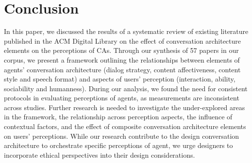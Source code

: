 
\section{Conclusion}

In this paper, we discussed the results of a systematic review of existing literature published in the ACM Digital Library on the effect of conversation architecture elements on the perceptions of CAs. Through our synthesis of 57 papers in our corpus, we present a framework outlining the relationships between elements of agents’ conversation architecture (dialog strategy, content affectiveness, content style and speech format) and aspects of users’ perception (interaction, ability, sociability and humanness). During our analysis, we found the need for consistent protocols in evaluating perceptions of agents, as measurements are inconsistent across studies. Further research is needed to investigate the under-explored areas in the framework, the relationship across perception aspects, the influence of contextual factors, and the effect of composite conversation architecture elements on users' perceptions. While our research contribute to the design conversation architecture to orchestrate specific perceptions of agent, we urge designers to incorporate ethical perspectives into their design considerations.